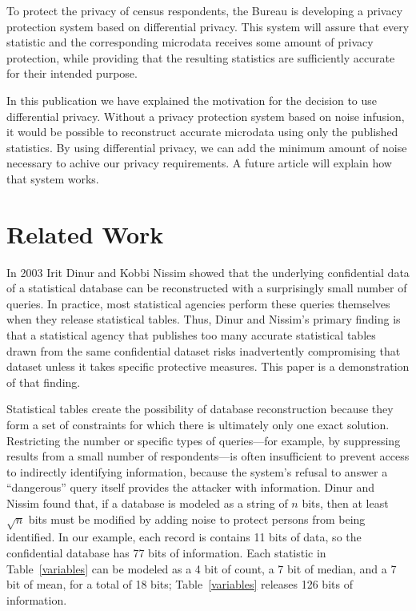 \documentclass[runningheads]{llncs}
\begin{document}
To protect the privacy of census respondents, the Bureau is developing
a privacy protection system based on differential privacy. This system
will assure that every statistic and the corresponding microdata
receives some amount of privacy protection, while providing that the
resulting statistics are sufficiently accurate for their intended
purpose.

In this publication we have explained the motivation for the decision
to use differential privacy. Without a privacy
protection system based on noise infusion, it would be possible to
reconstruct accurate microdata using only the published statistics. By
using differential privacy, we can add the minimum amount of noise
necessary to achive our privacy requirements. A future article will
explain how that system works.


\section{Related Work}

In 2003 Irit Dinur and Kobbi Nissim\cite{DinurNissim2003} showed that the underlying
confidential data of a statistical database can be reconstructed with
a surprisingly small number of queries. In practice, most statistical
agencies perform these queries themselves when they release
statistical tables. Thus, Dinur and Nissim's primary finding
is that a statistical agency that publishes too many accurate statistical
tables drawn from the same confidential dataset risks inadvertently
compromising that dataset unless it takes specific protective
measures. This paper is a demonstration of that finding.

Statistical tables create the possibility of database reconstruction
because they form a set of constraints for which there is ultimately
only one exact solution. Restricting the number or specific types of
queries---for example, by suppressing results from a small number of
respondents---is often insufficient to prevent access to indirectly
identifying information, because the system's refusal to answer a
``dangerous'' query itself provides the attacker with information.
Dinur and Nissim found that, if a database is modeled as a string of
$n$ bits, then at least $\sqrt{n}$ bits must be modified by adding
noise to protect persons from being identified. In our example, each
record is contains 11 bits of data, so the confidential database has
77 bits of information. Each statistic in Table~\ref{variables}
can be modeled as a 4 bit of count, a 7 bit of median, and a 7 bit of
mean, for a total of 18 bits; Table~\ref{variables} releases 126 bits
of information.
\end{document}
